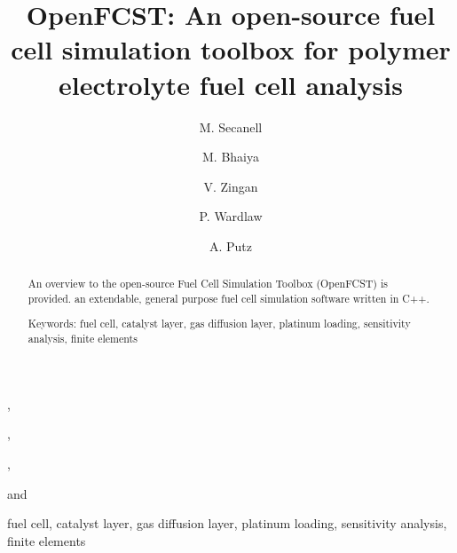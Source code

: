 \documentclass[]{elsart}
\begin{document}
\begin{frontmatter}

\title{OpenFCST: An open-source fuel cell simulation toolbox for polymer electrolyte fuel cell analysis}

\author[ESDLab]{M. Secanell},
\author[ESDLab]{M. Bhaiya},
\author[ESDLab]{V. Zingan},
\author[ESDLab]{P. Wardlaw} and
\author[AFCC]{A. Putz} 

\address[ESDLab]{Energy Systems Design Laboratory, Department of Mechanical Engineering, University of Alberta, Edmonton, AB, Canada}
\address[AFCC]{Automotive Fuel Cell Cooperation Corp., Burnaby, BC, Canada}
 

\begin{abstract}

An overview to the open-source Fuel Cell Simulation Toolbox (OpenFCST) is provided. an extendable, general purpose fuel cell simulation software written in C++.






Keywords: fuel cell, catalyst layer, gas diffusion layer, platinum loading, sensitivity analysis, finite elements
\end{abstract}

\begin{keyword}
    fuel cell, catalyst layer, gas diffusion layer, platinum loading, sensitivity analysis, finite elements
\end{keyword}

\end{frontmatter}
\end{document}
